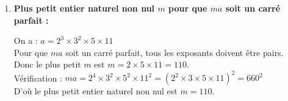 \documentclass[10pt, a4paper]{article}
\begin{document}
\begin{Solution}[APPLICATION][12]
\begin{enumerate}[leftmargin=*,itemsep=0.5pt]
    On a :
    \[\frac{a}{b} = \frac{2^3 \times 3^2 \times 5 \times 11}{2^2 \times 3 \times 5^2 \times 7} = \frac{2 \times 3 \times 11}{5 \times 7} = \frac{66}{35}\]


    Pour $\sqrt{ab}$, On a :
    \begin{align*}
        ab &= (2^3 \times 3^2 \times 5 \times 11) \times (2^2 \times 3 \times 5^2 \times 7) = 2^5 \times 3^3 \times 5^3 \times 7 \times 11
    \end{align*}

    Donc :
    \begin{align*}
        \sqrt{ab} &= \sqrt{2^5 \times 3^3 \times 5^3 \times 7 \times 11} \\
                  &= \sqrt{(2^4 \times 3^2 \times 5^2) \times (2 \times 3 \times 5 \times 7 \times 11)} \\
                  &= 2^2 \times 3 \times 5 \times \sqrt{2 \times 3 \times 5 \times 7 \times 11} \\
                  &= 60\sqrt{2310}
    \end{align*}

    \item \textbf{Plus petit entier naturel non nul $m$ pour que $ma$ soit un carré parfait :}

    On a : \quad $a = 2^3 \times 3^2 \times 5 \times 11$ \\
    Pour que $ma$ soit un carré parfait, tous les exposants doivent être pairs. \\
    Donc le plus petit $m$ est $m = 2 \times 5 \times 11 = 110$. \\
    Vérification : $ma = 2^4 \times 3^2 \times 5^2 \times 11^2 = (2^2 \times 3 \times 5 \times 11)^2 = 660^2$\\
    D'où le plus petit entier naturel non nul est $m = 110$.
\end{enumerate}
\end{Solution}
\end{document}
